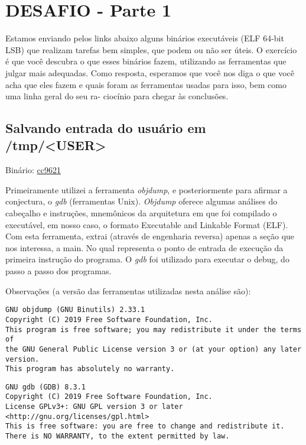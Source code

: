 \section{DESAFIO - Parte 1} \label{sec:desafio1}

Estamos enviando pelos links abaixo alguns binários executáveis (ELF
64-bit LSB) que realizam tarefas bem simples, que podem ou não ser
úteis. O exercício é que você descubra o que esses binários fazem,
utilizando as ferramentas que julgar mais adequadas. Como resposta,
esperamos que você nos diga o que você acha que eles fazem e quais
foram as ferramentas usadas para isso, bem como uma linha geral do seu
ra- ciocínio para chegar às conclusões.

\subsection{Salvando entrada do usuário em /tmp/<USER>}
Binário: \href{https://s3.amazonaws.com/chaordic-desafio-cloud/cc9621}{cc9621}

Primeiramente utilizei a ferramenta \emph{objdump}, e posteriormente
para afirmar a conjectura, o \emph{gdb} (ferramentas Unix).
\emph{Objdump} oferece algumas análises do cabeçalho e instruções,
mnemônicos da arquitetura em que foi compilado o executável, em nosso
caso, o formato Executable and Linkable Format (ELF). Com esta
ferramenta, extrai (através de engenharia reversa) apenas a seção que
nos interessa, a main. No qual representa o ponto de entrada de
execução da primeira instrução do programa. O \emph{gdb} foi utilizado
para executar o debug, do passo a passo dos programas.

Observações (a versão das ferramentas utilizadas nesta análise são):
\begin{verbatim}
GNU objdump (GNU Binutils) 2.33.1
Copyright (C) 2019 Free Software Foundation, Inc.
This program is free software; you may redistribute it under the terms of
the GNU General Public License version 3 or (at your option) any later version.
This program has absolutely no warranty.
\end{verbatim}

\begin{verbatim}
GNU gdb (GDB) 8.3.1
Copyright (C) 2019 Free Software Foundation, Inc.
License GPLv3+: GNU GPL version 3 or later <http://gnu.org/licenses/gpl.html>
This is free software: you are free to change and redistribute it.
There is NO WARRANTY, to the extent permitted by law.
\end{verbatim}

